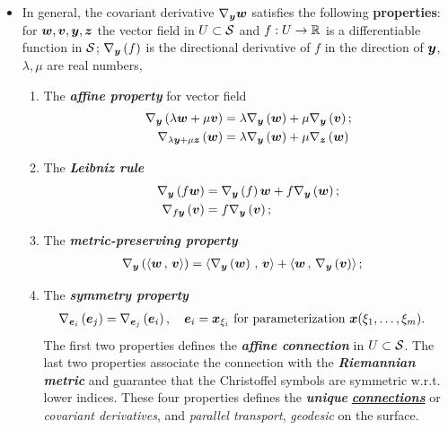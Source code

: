 \documentclass[11pt]{article}
\begin{document}
\begin{itemize}
\item In general, the covariant derivative $\nabla_{\boldsymbol{y}}\boldsymbol{w}$ satisfies the following \textbf{properties}: for $\boldsymbol{w}, \boldsymbol{v}, \boldsymbol{y}, \boldsymbol{z}$ the vector field in $U\subset {\mathcal S}$ and $f: U \rightarrow {\mathbb R}$ is a differentiable function in ${\mathcal S}$; $\nabla_{\boldsymbol{y}}\left(f\right)$ is the directional derivative of $f$ in the direction of $\boldsymbol{y}$, $\lambda, \mu$ are real numbers, 
\begin{enumerate}
\item The \emph{\textbf{affine property}} for vector field 
 \begin{align}
\nabla_{\boldsymbol{y}}\left(\lambda\boldsymbol{w}+ \mu\boldsymbol{v}\right) &= \lambda\nabla_{\boldsymbol{y}}\left(\boldsymbol{w}\right)+ \mu\nabla_{\boldsymbol{y}}\left(\boldsymbol{v}\right); \nonumber\\
\nabla_{\lambda\boldsymbol{y}+ \mu\boldsymbol{z}}\left(\boldsymbol{w}\right) &= \lambda\nabla_{\boldsymbol{y}}\left(\boldsymbol{w}\right)+ \mu\nabla_{\boldsymbol{z}}\left(\boldsymbol{w}\right) \label{eqn: connections_affine}
\end{align}
\item The \emph{\textbf{Leibniz rule}}
 \begin{align}
\nabla_{\boldsymbol{y}}\left(f\boldsymbol{w}\right) &= \nabla_{\boldsymbol{y}}\left(f\right)\boldsymbol{w}+ f\nabla_{\boldsymbol{y}}\left(\boldsymbol{w}\right); \nonumber\\
 \nabla_{f\boldsymbol{y}}\left(\boldsymbol{v}\right) &=  f\nabla_{\boldsymbol{y}}\left(\boldsymbol{v}\right); \label{eqn: connections_leibniz}
\end{align}
\item The \emph{\textbf{metric-preserving property}}
\begin{align}
\nabla_{\boldsymbol{y}}\left(\left\langle \boldsymbol{w}\,,\, \boldsymbol{v} \right\rangle\right) &= \left\langle \nabla_{\boldsymbol{y}}\left(\boldsymbol{w}\right)\,,\, \boldsymbol{v} \right\rangle + \left\langle \boldsymbol{w}\,,\, \nabla_{\boldsymbol{y}}\left(\boldsymbol{v}\right) \right\rangle; \label{eqn: connections_metric}
\end{align}
\item The \emph{\textbf{symmetry property}}
\begin{align}
\nabla_{\boldsymbol{e}_{i}}\left(\boldsymbol{e}_{j}\right) &= \nabla_{\boldsymbol{e}_{j}}\left(\boldsymbol{e}_{i}\right), \quad \boldsymbol{e}_{i} = \boldsymbol{x}_{\xi_{i}}\text{ for parameterization }\boldsymbol{x}(\xi_{1},\ldots, \xi_{m}).  \label{eqn: connections_symmetric}
\end{align}
The first two properties defines the \emph{\textbf{affine connection}} in $U\subset {\mathcal S}$. The last two properties associate the connection with the \emph{\textbf{Riemannian metric}} and guarantee that the Christoffel symbols are symmetric w.r.t. lower indices. These four properties defines the \emph{\textbf{unique}} \underline{\emph{\textbf{connections}}} or \emph{covariant derivatives}, and \emph{parallel transport}, \emph{geodesic} on the surface. 
\end{enumerate}



\end{itemize}
\end{document}
